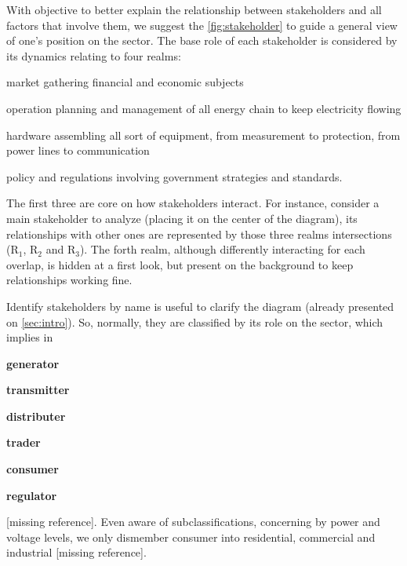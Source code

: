 With objective to better explain the relationship between stakeholders and all factors that involve them, we suggest the \autoref{fig:stakeholder} to guide a general view of one's position on the sector.
The base role of each stakeholder is considered by its dynamics relating to four realms:
\begin{itemize*}[font={\bfseries}, itemjoin={{; }}, itemjoin*={{; and }}, afterlabel={{, }}]
  \item [market] gathering financial and economic subjects
  \item [operation] planning and management of all energy chain to keep electricity flowing
  \item [hardware] assembling all sort of equipment, from measurement to protection, from power lines to communication
  \item [policy and regulations] involving government strategies and standards.%
\end{itemize*}

The first three are core on how stakeholders interact.
For instance, consider a main stakeholder to analyze (placing it on the center of the diagram), its relationships with other ones are represented by those three realms intersections (R$_{1}$, R$_{2}$ and R$_{3}$).
The forth realm, although differently interacting for each overlap, is hidden at a first look, but present on the background to keep relationships working fine.

Identify stakeholders by name is useful to clarify the diagram (already presented on \autoref{sec:intro}).
So, normally, they are classified by its role on the sector, which implies in
\begin{itemize*}[label={}, before=\unskip{:}, itemjoin={{,}}, itemjoin*={{ and}}]
    \item \textbf{generator}
    \item \textbf{transmitter}
    \item \textbf{distributer}
    \item \textbf{trader}
    \item \textbf{consumer}%
    \item \textbf{regulator}%
\end{itemize*}
[missing reference].
Even aware of subclassifications, concerning by power and voltage levels, we only dismember consumer into residential, commercial and industrial [missing reference]. %


